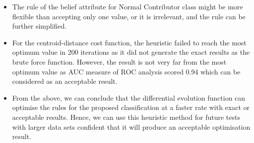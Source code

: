 \begin{itemize}
    
    \item The rule of the belief attribute for Normal Contributor class might be more flexible than accepting only one value, or it is irrelevant, and the rule can be further simplified.
    
    \item For the centroid-distance cost function, the heuristic failed to reach the most optimum value in 200 iterations as it did not generate the exact results as the brute force function. However, the result is not very far from the most optimum value as AUC measure of ROC analysis scored 0.94 which can be considered as an acceptable result.
    
    \item From the above, we can conclude that the differential evolution function can optimise the rules for the proposed classification at a faster rate with exact or acceptable results. Hence, we can use this heuristic method for future tests with larger data sets confident that it will produce an acceptable optimisation result.
    
\end{itemize}
